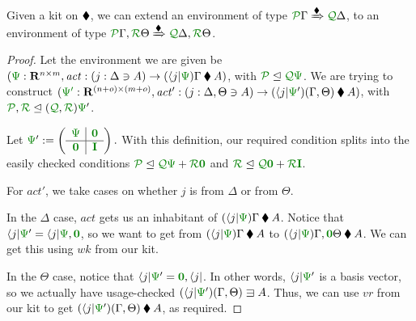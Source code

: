 \documentclass[submission,copyright,creativecommons]{eptcs}
\begin{document}
\begin{lemma}\label{lem:bind}
  Given a kit on $\mathbin{\blacklozenge}$, we can extend an environment of type
  $\ctx{\Gamma}{P} \subst{\kitrel} \ctx{\Delta}{Q}$, to an environment of type
  $\ctx{\Gamma}{P}, \ctx{\Theta}{R} \subst{\kitrel}
  \ctx{\Delta}{Q}, \ctx{\Theta}{R}$.
\end{lemma}
\begin{proof}
  Let the environment we are given be
  $(\rescomment\Psi : \mathbf R^{n \times m},
  \mathit{act} : (j : \Delta \ni A) \to (\langle j \rvert\rescomment\Psi)\Gamma \kitrel A)$,
  with $\resctx P \subres \resctx Q \rescomment\Psi$.
  We are trying to construct
  $(\rescomment{\Psi'} : \mathbf R^{(n + o) \times (m + o)},
  \mathit{act'} : (j : \Delta, \Theta \ni A) \to
  (\langle j \rvert\rescomment\Psi')(\Gamma, \Theta) \kitrel A)$,
  with $\resctx P, \resctx R \subres (\resctx Q, \resctx R) \rescomment\Psi'$.

  Let \(
    \rescomment\Psi' := \left(\begin{array}{c|c}
                                \rescomment\Psi & \rescomment{\mat 0}
                                \\ \hline
                                \rescomment{\mat 0} & \rescomment{\mat I}
                              \end{array}\right).
  \)
  With this definition, our required condition splits into the easily checked
  conditions
  $\resctx P \subres \resctx Q\rescomment\Psi + \resctx R\rescomment{\mat 0}$
  and
  $\resctx R \subres
  \resctx Q\rescomment{\mat 0} + \resctx R\rescomment{\mat I}$.

  For $\mathit{act'}$, we take cases on whether $j$ is from $\Delta$ or from
  $\Theta$.

  In the $\Delta$ case, $\mathit{act}$ gets us an inhabitant of
  $(\langle j \rvert\rescomment\Psi)\Gamma \kitrel A$.
  Notice that
  $\langle j \rvert\rescomment\Psi' =
  \langle j \rvert\rescomment\Psi, \rescomment{\vct 0}$,
  so we want to get from $(\langle j \rvert\rescomment\Psi)\Gamma \kitrel A$ to
  $(\langle j \rvert\rescomment\Psi)\Gamma, \rescomment{\vct 0}\Theta
  \kitrel A$.
  We can get this using $\mathit{wk}$ from our kit.

  In the $\Theta$ case, notice that
  $\langle j \rvert\rescomment\Psi' = \rescomment{\vct 0}, \langle j \rvert$.
  In other words, $\langle j \rvert\rescomment\Psi'$ is a basis vector, so we
  actually have usage-checked
  $(\langle j \rvert\rescomment\Psi')(\Gamma, \Theta) \lvar A$.
  Thus, we can use $\mathit{vr}$ from our kit to get
  $(\langle j \rvert\rescomment\Psi')(\Gamma, \Theta) \kitrel A$, as required.
\end{proof}
\end{document}
